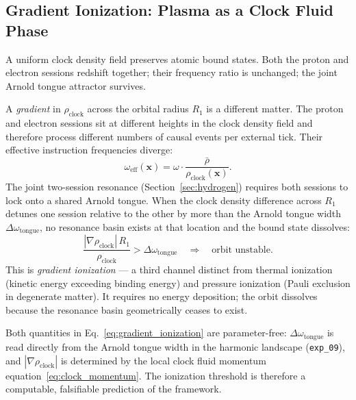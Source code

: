 \subsection{Gradient Ionization: Plasma as a Clock Fluid Phase}
\label{subsec:gradient_ionization}

A uniform clock density field preserves atomic bound states.
Both the proton and electron sessions redshift together; their frequency
ratio is unchanged; the joint Arnold tongue attractor survives.

A \emph{gradient} in $\rho_\text{clock}$ across the orbital radius $R_1$
is a different matter.
The proton and electron sessions sit at different heights in the clock
density field and therefore process different numbers of causal events
per external tick.
Their effective instruction frequencies diverge:
\begin{equation}
    \omega_\text{eff}(\mathbf{x})
        = \omega \cdot \frac{\bar\rho}{\rho_\text{clock}(\mathbf{x})}.
    \label{eq:freq_detuning}
\end{equation}
The joint two-session resonance (Section~\ref{sec:hydrogen}) requires
both sessions to lock onto a shared Arnold tongue.
When the clock density difference across $R_1$ detunes one session
relative to the other by more than the Arnold tongue width
$\Delta\omega_\text{tongue}$, no resonance basin exists at that location
and the bound state dissolves:
\begin{equation}
    \frac{|\nabla\rho_\text{clock}|\,R_1}{\rho_\text{clock}}
        > \Delta\omega_\text{tongue}
    \quad\Longrightarrow\quad
    \text{orbit unstable.}
    \label{eq:gradient_ionization}
\end{equation}
This is \emph{gradient ionization} --- a third channel distinct from
thermal ionization (kinetic energy exceeding binding energy) and pressure
ionization (Pauli exclusion in degenerate matter).
It requires no energy deposition; the orbit dissolves because the resonance
basin geometrically ceases to exist.

Both quantities in Eq.~\eqref{eq:gradient_ionization} are parameter-free:
$\Delta\omega_\text{tongue}$ is read directly from the Arnold tongue
width in the harmonic landscape (\texttt{exp\_09}), and
$|\nabla\rho_\text{clock}|$ is determined by the local clock fluid
momentum equation~\eqref{eq:clock_momentum}.
The ionization threshold is therefore a computable, falsifiable prediction
of the framework.

